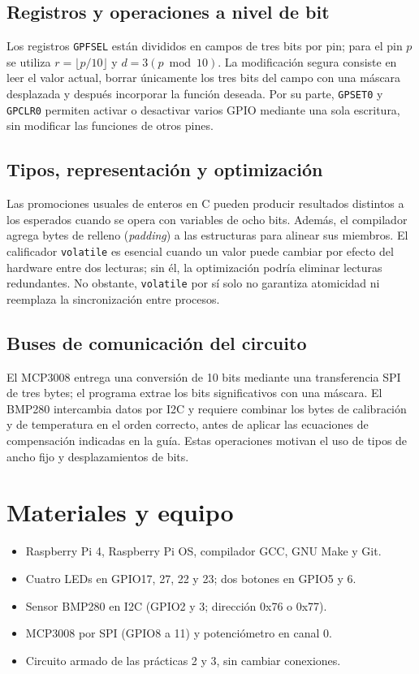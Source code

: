 \documentclass[conference]{IEEEtran}
\begin{document}
\subsection{Registros y operaciones a nivel de bit}
Los registros \texttt{GPFSEL} están divididos en campos de tres bits por pin; para el pin $p$ se utiliza $r=\lfloor p/10\rfloor$ y $d=3(p\bmod 10)$. La modificación segura consiste en leer el valor actual, borrar únicamente los tres bits del campo con una máscara desplazada y después incorporar la función deseada. Por su parte, \texttt{GPSET0} y \texttt{GPCLR0} permiten activar o desactivar varios GPIO mediante una sola escritura, sin modificar las funciones de otros pines.

\subsection{Tipos, representación y optimización}
Las promociones usuales de enteros en C pueden producir resultados distintos a los esperados cuando se opera con variables de ocho bits. Además, el compilador agrega bytes de relleno (\textit{padding}) a las estructuras para alinear sus miembros. El calificador \texttt{volatile} es esencial cuando un valor puede cambiar por efecto del hardware entre dos lecturas; sin él, la optimización podría eliminar lecturas redundantes. No obstante, \texttt{volatile} por sí solo no garantiza atomicidad ni reemplaza la sincronización entre procesos.

\subsection{Buses de comunicación del circuito}
El MCP3008 entrega una conversión de 10 bits mediante una transferencia SPI de tres bytes; el programa extrae los bits significativos con una máscara. El BMP280 intercambia datos por I2C y requiere combinar los bytes de calibración y de temperatura en el orden correcto, antes de aplicar las ecuaciones de compensación indicadas en la guía. Estas operaciones motivan el uso de tipos de ancho fijo y desplazamientos de bits.
\section{Materiales y equipo}
\begin{itemize}
\item Raspberry Pi 4, Raspberry Pi OS, compilador GCC, GNU Make y Git.
\item Cuatro LEDs en GPIO17, 27, 22 y 23; dos botones en GPIO5 y 6.
\item Sensor BMP280 en I2C (GPIO2 y 3; dirección 0x76 o 0x77).
\item MCP3008 por SPI (GPIO8 a 11) y potenciómetro en canal 0.
\item Circuito armado de las prácticas 2 y 3, sin cambiar conexiones.
\end{itemize}
\end{document}
